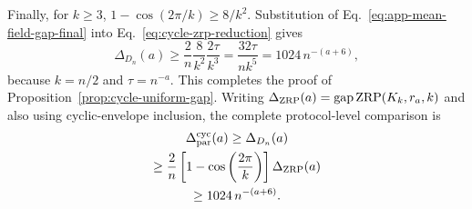 Finally, for $k\geq3$,
$1-\cos(2\pi/k)\geq8/k^2$.  Substitution of
Eq.~\eqref{eq:app-mean-field-gap-final} into
Eq.~\eqref{eq:cycle-zrp-reduction} gives
\begin{equation}
 \Delta_{D_n}(a)
 \geq\frac2n\frac8{k^2}\frac{2\tau}{k^3}
 =\frac{32\tau}{nk^5}
 =1024\,n^{-(a+6)},
\end{equation}
because $k=n/2$ and $\tau=n^{-a}$.  This completes the proof of
Proposition~\ref{prop:cycle-uniform-gap}.  Writing
$\Delta_{\rm ZRP}(a)=\operatorname{gap}\operatorname{ZRP}(K_k,r_a,k)$
and also using cyclic-envelope inclusion, the complete protocol-level comparison
is
\begin{multline}
 \Delta_{\rm par}^{\rm cyc}(a)\geq\Delta_{D_n}(a)\\
 \geq\frac2n\left[1-\cos\left(\frac{2\pi}{k}\right)\right]
 \Delta_{\rm ZRP}(a)\\
 \geq1024\,n^{-(a+6)}.
 \label{eq:gap-proof-architecture}
\end{multline}

